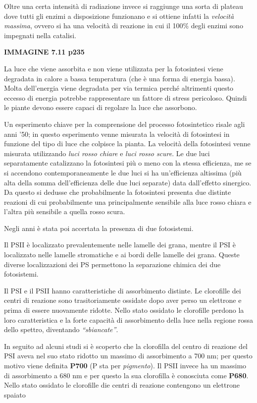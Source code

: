 \documentclass[]{article}
\begin{document}
Oltre una certa intensità di radiazione invece si raggiunge una sorta di
plateau dove tutti gli enzimi a disposizione funzionano e si ottiene
infatti la \emph{velocità massima}, ovvero si ha una velocità di
reazione in cui il 100\% degli enzimi sono impegnati nella catalisi.

\textbf{IMMAGINE 7.11 p235}

La luce che viene assorbita e non viene utilizzata per la fotosintesi
viene degradata in calore a bassa temperatura (che è una forma di
energia bassa). Molta dell'energia viene degradata per via termica
perché altrimenti questo eccesso di energia potrebbe rappresentare un
fattore di stress pericoloso. Quindi le piante devono essere capaci di
regolare la luce che assorbono.

Un esperimento chiave per la comprensione del processo fotosintetico
risale agli anni '50; in questo esperimento venne misurata la velocità
di fotosintesi in funzione del tipo di luce che colpisce la pianta. La
velocità della fotosintesi venne misurata utilizzando \emph{luci rosso
chiare} e \emph{luci rosso scure}. Le due luci separatamente catalizzano
la fotosintesi più o meno con la stessa efficienza, me se si accendono
contemporaneamente le due luci si ha un'efficienza altissima (più alta
della somma dell'efficienza delle due luci separate) data dall'effetto
sinergico. Da questo si dedusse che probabilmente la fotosintesi
presenta due distinte reazioni di cui probabilmente una principalmente
sensibile alla luce rosso chiara e l'altra più sensibile a quella rosso
scura.

Negli anni è stata poi accertata la presenza di due fotosistemi.

Il PSII è localizzato prevalentemente nelle lamelle dei grana, mentre il
PSI è localizzato nelle lamelle stromatiche e ai bordi delle lamelle dei
grana. Queste diverse localizzazioni dei PS permettono la separazione
chimica dei due fotosistemi.

Il PSI e il PSII hanno caratteristiche di assorbimento distinte. Le
clorofille dei centri di reazione sono trasitoriamente ossidate dopo
aver perso un elettrone e prima di essere nuovamente ridotte. Nello
stato ossidato le clorofille perdono la loro caratteristica e la forte
capacità di assorbimento della luce nella regione rossa dello spettro,
diventando \emph{``sbiancate''}.

In seguito ad alcuni studi si è scoperto che la clorofilla del centro di
reazione del PSI aveva nel suo stato ridotto un massimo di assorbimento
a 700 nm; per questo motivo viene definita \textbf{P700} (P sta per
\emph{pigmento}). Il PSII invece ha un massimo di assorbimento a 680 nm
e per questo la sua clorofilla è conosciuta come \textbf{P680}. Nello
stato ossidato le clorofille die centri di reazione contengono un
elettrone spaiato
\end{document}

